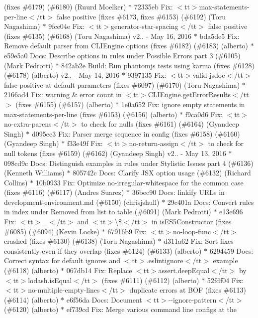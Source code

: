 \begin{DoxyItemize}
(fixes \#6179) (\#6180) (\+Ruurd Moelker) \texorpdfstring{$\ast$}{*} 72335eb Fix\+: $<$tt$>$max-\/statements-\/per-\/line$<$/tt$>$ false positive (fixes \#6173, fixes \#6153) (\#6192) (\+Toru Nagashima) \texorpdfstring{$\ast$}{*} 9fce04e Fix\+: $<$tt$>$generator-\/star-\/spacing$<$/tt$>$ false positive (fixes \#6135) (\#6168) (\+Toru Nagashima)  v2.. -\/ May 16, 2016  \texorpdfstring{$\ast$}{*} bda5de5 Fix\+: Remove default parser from CLIEngine options (fixes \#6182) (\#6183) (alberto) \texorpdfstring{$\ast$}{*} e59e5a0 Docs\+: Describe options in rules under Possible Errors part 3 (\#6105) (\+Mark Pedrotti) \texorpdfstring{$\ast$}{*} 842ab2e Build\+: Run phantomjs tests using karma (fixes \#6128) (\#6178) (alberto)  v2.. -\/ May 14, 2016  \texorpdfstring{$\ast$}{*} 9397135 Fix\+: $<$tt$>$valid-\/jsdoc$<$/tt$>$ false positive at default parameters (fixes \#6097) (\#6170) (\+Toru Nagashima) \texorpdfstring{$\ast$}{*} 2166ad4 Fix\+: warning \& error count in $<$tt$>$\+CLIEngine.\+get\+Error\+Results$<$/tt$>$ (fixes \#6155) (\#6157) (alberto) \texorpdfstring{$\ast$}{*} 1e0a652 Fix\+: ignore empty statements in max-\/statements-\/per-\/line (fixes \#6153) (\#6156) (alberto) \texorpdfstring{$\ast$}{*} f9ca0d6 Fix\+: $<$tt$>$no-\/extra-\/parens$<$/tt$>$ to check for nulls (fixes \#6161) (\#6164) (\+Gyandeep Singh) \texorpdfstring{$\ast$}{*} d095ee3 Fix\+: Parser merge sequence in config (fixes \#6158) (\#6160) (\+Gyandeep Singh) \texorpdfstring{$\ast$}{*} f33e49f Fix\+: $<$tt$>$no-\/return-\/assign$<$/tt$>$ to check for null tokens (fixes \#6159) (\#6162) (\+Gyandeep Singh)  v2.. -\/ May 13, 2016  \texorpdfstring{$\ast$}{*} 098cd9c Docs\+: Distinguish examples in rules under Stylistic Issues part 4 (\#6136) (\+Kenneth Williams) \texorpdfstring{$\ast$}{*} 805742c Docs\+: Clarify JSX option usage (\#6132) (\+Richard Collins) \texorpdfstring{$\ast$}{*} 10b0933 Fix\+: Optimize no-\/irregular-\/whitespace for the common case (fixes \#6116) (\#6117) (\+Andres Suarez) \texorpdfstring{$\ast$}{*} 36bec90 Docs\+: linkify URLs in development-\/environment.\+md (\#6150) (chrisjshull) \texorpdfstring{$\ast$}{*} 29c401a Docs\+: Convert rules in index under Removed from list to table (\#6091) (\+Mark Pedrotti) \texorpdfstring{$\ast$}{*} e13e696 Fix\+: $<$tt$>$\+\_\+$<$/tt$>$ and $<$tt$>$\textbackslash{}\$$<$/tt$>$ in is\+ES5\+Constructor (fixes \#6085) (\#6094) (\+Kevin Locke) \texorpdfstring{$\ast$}{*} 67916b9 Fix\+: $<$tt$>$no-\/loop-\/func$<$/tt$>$ crashed (fixes \#6130) (\#6138) (\+Toru Nagashima) \texorpdfstring{$\ast$}{*} d311a62 Fix\+: Sort fixes consistently even if they overlap (fixes \#6124) (\#6133) (alberto) \texorpdfstring{$\ast$}{*} 6294459 Docs\+: Correct syntax for default ignores and $<$tt$>$.\+eslintignore$<$/tt$>$ example (\#6118) (alberto) \texorpdfstring{$\ast$}{*} 067db14 Fix\+: Replace $<$tt$>$assert.\+deep\+Equal$<$/tt$>$ by $<$tt$>$lodash.\+is\+Equal$<$/tt$>$ (fixes \#6111) (\#6112) (alberto) \texorpdfstring{$\ast$}{*} 52fdf04 Fix\+: $<$tt$>$no-\/multiple-\/empty-\/lines$<$/tt$>$ duplicate errors at BOF (fixes \#6113) (\#6114) (alberto) \texorpdfstring{$\ast$}{*} e6f56da Docs\+: Document $<$tt$>$-\/-\/ignore-\/pattern$<$/tt$>$ (\#6120) (alberto) \texorpdfstring{$\ast$}{*} ef739cd Fix\+: Merge various command line configs at the 
\end{DoxyItemize}
